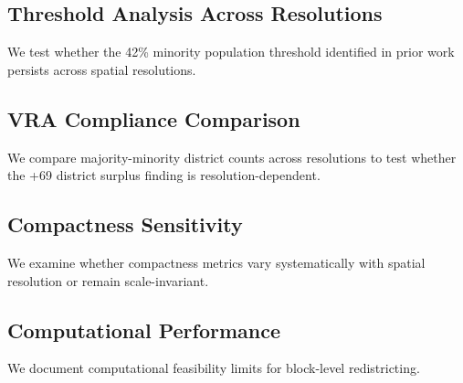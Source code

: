 
\subsection{Threshold Analysis Across Resolutions}


We test whether the 42\% minority population threshold identified in prior work \citep{threshold-paper} persists across spatial resolutions.

\subsection{VRA Compliance Comparison}


We compare majority-minority district counts across resolutions to test whether the +69 district surplus finding is resolution-dependent.

\subsection{Compactness Sensitivity}


We examine whether compactness metrics vary systematically with spatial resolution or remain scale-invariant.

\subsection{Computational Performance}


We document computational feasibility limits for block-level redistricting.
